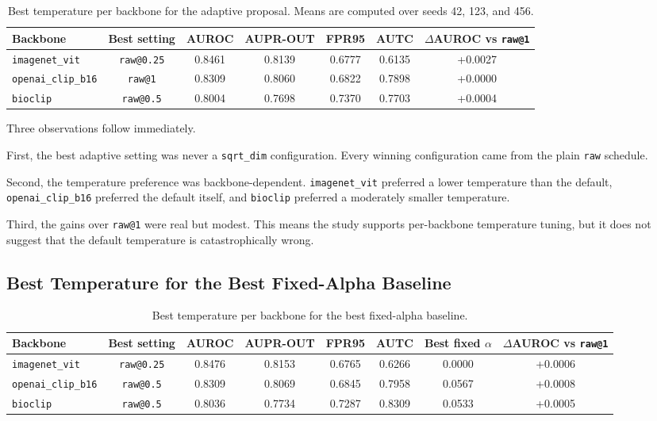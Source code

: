 \documentclass[11pt]{article}
\begin{document}
\begin{table}[h]
\centering
\small
\begin{tabular}{lcccccc}
\toprule
Backbone & Best setting & AUROC & AUPR-OUT & FPR95 & AUTC & $\Delta$AUROC vs \texttt{raw@1} \\
\midrule
\texttt{imagenet\_vit} & \texttt{raw@0.25} & 0.8461 & 0.8139 & 0.6777 & 0.6135 & +0.0027 \\
\texttt{openai\_clip\_b16} & \texttt{raw@1} & 0.8309 & 0.8060 & 0.6822 & 0.7898 & +0.0000 \\
\texttt{bioclip} & \texttt{raw@0.5} & 0.8004 & 0.7698 & 0.7370 & 0.7703 & +0.0004 \\
\bottomrule
\end{tabular}
\caption{Best temperature per backbone for the adaptive proposal. Means are computed over seeds 42, 123, and 456.}
\end{table}

Three observations follow immediately.

First, the best adaptive setting was never a \texttt{sqrt\_dim} configuration. Every winning configuration came from the plain \texttt{raw} schedule.

Second, the temperature preference was backbone-dependent. \texttt{imagenet\_vit} preferred a lower temperature than the default, \texttt{openai\_clip\_b16} preferred the default itself, and \texttt{bioclip} preferred a moderately smaller temperature.

Third, the gains over \texttt{raw@1} were real but modest. This means the study supports per-backbone temperature tuning, but it does not suggest that the default temperature is catastrophically wrong.

\subsection{Best Temperature for the Best Fixed-Alpha Baseline}

\begin{table}[h]
\centering
\small
\begin{tabular}{lccccccc}
\toprule
Backbone & Best setting & AUROC & AUPR-OUT & FPR95 & AUTC & Best fixed $\alpha$ & $\Delta$AUROC vs \texttt{raw@1} \\
\midrule
\texttt{imagenet\_vit} & \texttt{raw@0.25} & 0.8476 & 0.8153 & 0.6765 & 0.6266 & 0.0000 & +0.0006 \\
\texttt{openai\_clip\_b16} & \texttt{raw@0.5} & 0.8309 & 0.8069 & 0.6845 & 0.7958 & 0.0567 & +0.0008 \\
\texttt{bioclip} & \texttt{raw@0.5} & 0.8036 & 0.7734 & 0.7287 & 0.8309 & 0.0533 & +0.0005 \\
\bottomrule
\end{tabular}
\caption{Best temperature per backbone for the best fixed-alpha baseline.}
\end{table}
\end{document}
